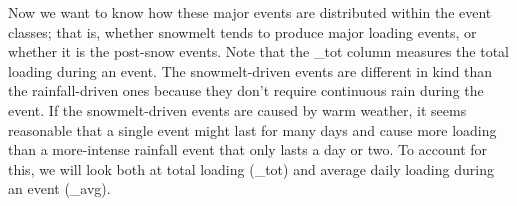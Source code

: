 \documentclass[12pt]{article}
\begin{document}
Now we want to know how these major events are distributed within the event classes; that is, whether snowmelt tends to produce major loading events, or whether it is the post-snow events. Note that the \_tot column measures the total loading during an event. The snowmelt-driven events are different in kind than the rainfall-driven ones because they don't require continuous rain during the event. If the snowmelt-driven events are caused by warm weather, it seems reasonable that a single event might last for many days and cause more loading than a more-intense rainfall event that only lasts a day or two. To account for this, we will look both at total loading (\_tot) and average daily loading during an event (\_avg).\\
\end{document}
